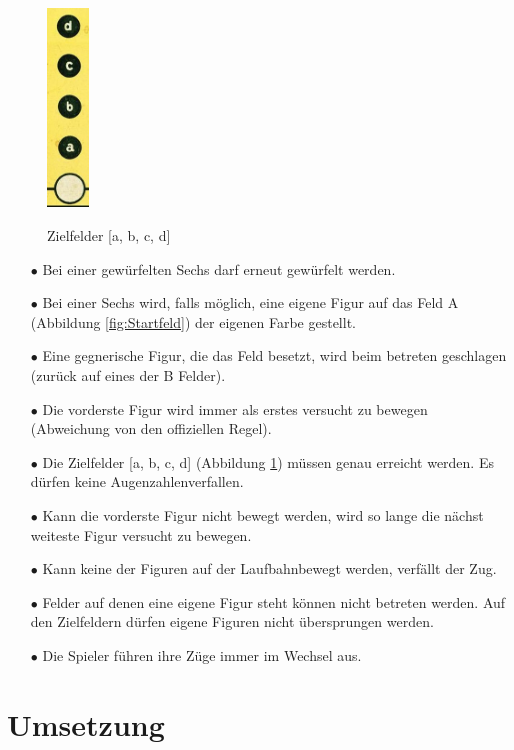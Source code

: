 \documentclass[a4paper,11pt,ngerman]{scrartcl}
\begin{document}
\begin{figure} 
	\centering
	\includegraphics[width=0.1\textwidth]{goal}		
	\caption{}
	\small{Zielfelder [a, b, c, d]}
	\label{fig:Zielfelder}
\end{figure}
\begin{enumerate}
	
	\item [$\bullet$] Bei einer gewürfelten Sechs darf erneut gewürfelt werden.
	\item [$\bullet$]Bei einer Sechs wird, falls möglich, eine eigene Figur auf das Feld A (Abbildung \ref{fig:Startfeld}) der eigenen Farbe gestellt.
	\item [$\bullet$] Eine gegnerische Figur, die das Feld besetzt, wird beim betreten geschlagen (zurück auf eines der B Felder).
	\item [$\bullet$] Die vorderste Figur wird immer als erstes versucht zu bewegen (Abweichung von den offiziellen Regel).
	\item [$\bullet$] Die Zielfelder [a, b, c, d] (Abbildung \ref{fig:Zielfelder}) müssen genau erreicht werden. Es dürfen keine \glqq Augenzahlen\grqq\space verfallen.
	\item [$\bullet$] Kann die vorderste Figur nicht bewegt werden, wird so lange die nächst weiteste Figur versucht zu bewegen.
	\item [$\bullet$] Kann keine der Figuren auf der \glqq Laufbahn\grqq \space bewegt werden, verfällt der Zug.
	\item [$\bullet$] Felder auf denen eine eigene Figur steht können nicht betreten werden. Auf den Zielfeldern dürfen eigene Figuren nicht übersprungen werden.
	\item [$\bullet$] Die Spieler führen ihre Züge immer im Wechsel aus.
\end{enumerate}


\section{Umsetzung}
 
\end{document}
